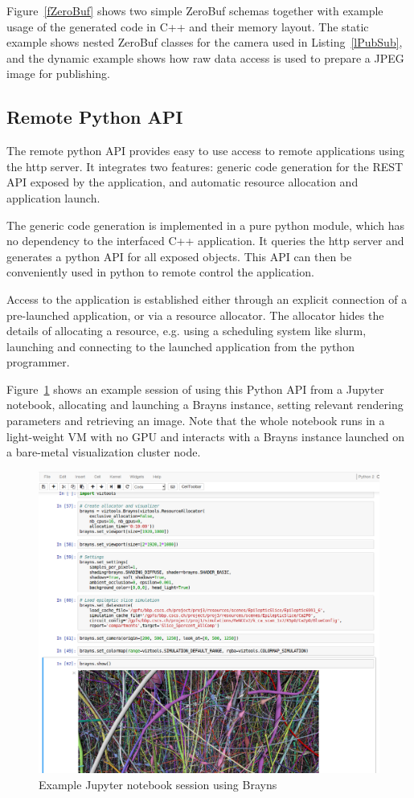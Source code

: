 \documentclass[10pt]{llncs}
\newcommand{\lref}[1]{Listing~\ref{#1}}
\newcommand{\fig}[1]{Figure~\ref{#1}}
\begin{document}
\fig{fZeroBuf} shows two simple ZeroBuf schemas together with example usage of
the generated code in C++ and their memory layout. The static example shows
nested ZeroBuf classes for the camera used in \lref{lPubSub}, and the dynamic
example shows how raw data access is used to prepare a JPEG image for
publishing.

\subsection{Remote Python API}

The remote python API provides easy to use access to remote applications using
the http server. It integrates two features: generic code generation for the
REST API exposed by the application, and automatic resource allocation and
application launch.

The generic code generation is implemented in a pure python module, which has
no dependency to the interfaced C++ application. It queries the http server and
generates a python API for all exposed objects. This API can then be
conveniently used in python to remote control the application.

Access to the application is established either through an explicit connection
of a pre-launched application, or via a resource allocator. The allocator hides
the details of allocating a resource, e.g. using a scheduling system like
slurm, launching and connecting to the launched application from the python
programmer.

\fig{fJupyter} shows an example session of using this Python API from a Jupyter
notebook, allocating and launching a Brayns instance, setting relevant rendering
parameters and retrieving an image. Note that the whole notebook runs in a
light-weight VM with no GPU and interacts with a Brayns instance launched on a
bare-metal visualization cluster node.

\begin{figure}[ht]\center
  \includegraphics[width=\columnwidth]{images/jupyter}
  \caption{\label{fJupyter}Example Jupyter notebook session using Brayns}
\end{figure}
\end{document}
